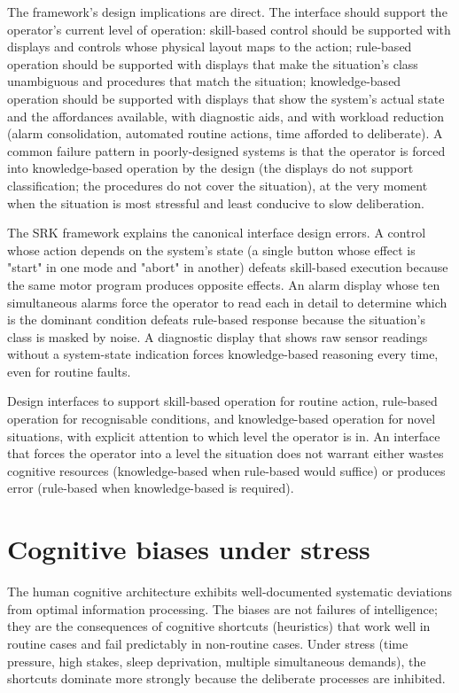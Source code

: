 The framework's design implications are direct. The interface should support the operator's current level of operation: skill-based control should be supported with displays and controls whose physical layout maps to the action; rule-based operation should be supported with displays that make the situation's class unambiguous and procedures that match the situation; knowledge-based operation should be supported with displays that show the system's actual state and the affordances available, with diagnostic aids, and with workload reduction (alarm consolidation, automated routine actions, time afforded to deliberate). A common failure pattern in poorly-designed systems is that the operator is forced into knowledge-based operation by the design (the displays do not support classification; the procedures do not cover the situation), at the very moment when the situation is most stressful and least conducive to slow deliberation.

The SRK framework explains the canonical interface design errors. A control whose action depends on the system's state (a single button whose effect is "start" in one mode and "abort" in another) defeats skill-based execution because the same motor program produces opposite effects. An alarm display whose ten simultaneous alarms force the operator to read each in detail to determine which is the dominant condition defeats rule-based response because the situation's class is masked by noise. A diagnostic display that shows raw sensor readings without a system-state indication forces knowledge-based reasoning every time, even for routine faults.

\begin{principle}
Design interfaces to support skill-based operation for routine action, rule-based operation for recognisable conditions, and knowledge-based operation for novel situations, with explicit attention to which level the operator is in. An interface that forces the operator into a level the situation does not warrant either wastes cognitive resources (knowledge-based when rule-based would suffice) or produces error (rule-based when knowledge-based is required).
\end{principle}

\section{Cognitive biases under stress}

The human cognitive architecture exhibits well-documented systematic deviations from optimal information processing. The biases are not failures of intelligence; they are the consequences of cognitive shortcuts (heuristics) that work well in routine cases and fail predictably in non-routine cases. Under stress (time pressure, high stakes, sleep deprivation, multiple simultaneous demands), the shortcuts dominate more strongly because the deliberate processes are inhibited.

